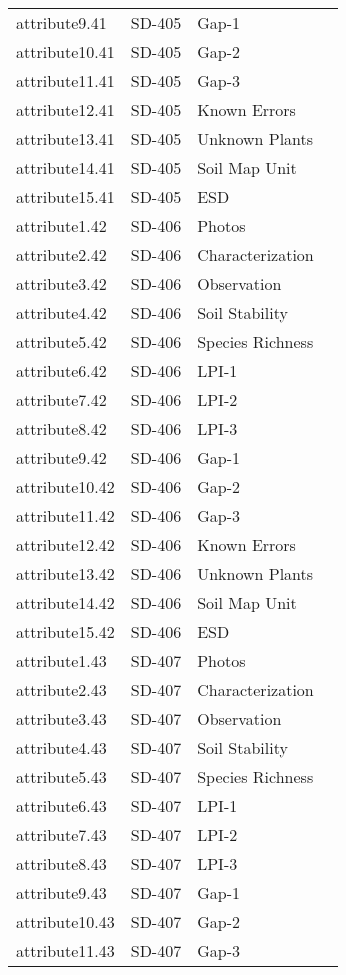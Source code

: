 \documentclass[
]{article}
\begin{document}
\begin{longtable}[]{@{}llll@{}}
attribute9.41 & SD-405 & Gap-1 & \\
attribute10.41 & SD-405 & Gap-2 & \\
attribute11.41 & SD-405 & Gap-3 & \\
attribute12.41 & SD-405 & Known Errors & \\
attribute13.41 & SD-405 & Unknown Plants & \\
attribute14.41 & SD-405 & Soil Map Unit & \\
attribute15.41 & SD-405 & ESD & \\
attribute1.42 & SD-406 & Photos & \\
attribute2.42 & SD-406 & Characterization & \\
attribute3.42 & SD-406 & Observation & \\
attribute4.42 & SD-406 & Soil Stability & \\
attribute5.42 & SD-406 & Species Richness & \\
attribute6.42 & SD-406 & LPI-1 & \\
attribute7.42 & SD-406 & LPI-2 & \\
attribute8.42 & SD-406 & LPI-3 & \\
attribute9.42 & SD-406 & Gap-1 & \\
attribute10.42 & SD-406 & Gap-2 & \\
attribute11.42 & SD-406 & Gap-3 & \\
attribute12.42 & SD-406 & Known Errors & \\
attribute13.42 & SD-406 & Unknown Plants & \\
attribute14.42 & SD-406 & Soil Map Unit & \\
attribute15.42 & SD-406 & ESD & \\
attribute1.43 & SD-407 & Photos & \\
attribute2.43 & SD-407 & Characterization & \\
attribute3.43 & SD-407 & Observation & \\
attribute4.43 & SD-407 & Soil Stability & \\
attribute5.43 & SD-407 & Species Richness & \\
attribute6.43 & SD-407 & LPI-1 & \\
attribute7.43 & SD-407 & LPI-2 & \\
attribute8.43 & SD-407 & LPI-3 & \\
attribute9.43 & SD-407 & Gap-1 & \\
attribute10.43 & SD-407 & Gap-2 & \\
attribute11.43 & SD-407 & Gap-3 & \\

\end{longtable}
\end{document}
